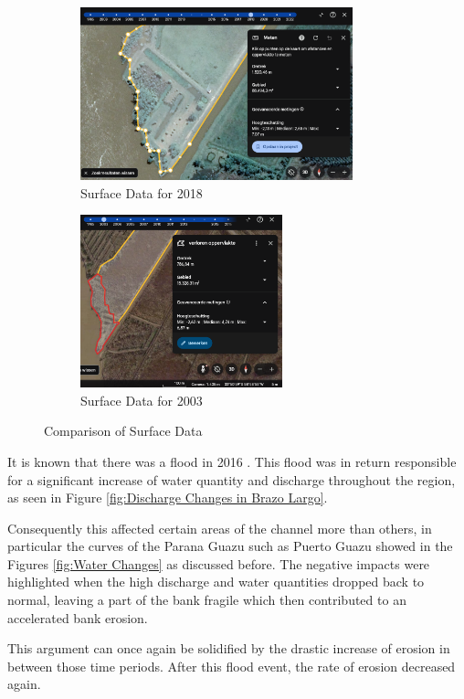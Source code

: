 \begin{figure}[H]
\begin{subfigure}[b]{0.45\textwidth}
        \includegraphics[width=\linewidth, height=5cm]{figures/appendix-g/opp2018.png}
        \caption{Surface Data for 2018}
        \label{fig:surface2018}
    \end{subfigure}
    \hfill
    \begin{subfigure}[b]{0.45\textwidth} %
        \includegraphics[width=\linewidth, height=5cm]{figures/appendix-g/verlorenopp2003.png}
        \caption{Surface Data for 2003}
        \label{fig:surface2003.2}
    \end{subfigure}
    \caption{Comparison of Surface Data}
    \label{fig:surface_comparison}
\end{figure}

It is known that there was a flood in 2016 \autocite{ArgentinaInundacionesDesde2016}. This flood was in return responsible for a significant increase of water quantity and discharge throughout the region, as seen in Figure \ref{fig:Discharge Changes in Brazo Largo}.

Consequently this affected certain areas of the channel more than others, in particular the curves of the Parana Guazu such as Puerto Guazu showed in the Figures \ref{fig:Water Changes} as discussed before. The negative impacts were highlighted when the high discharge and water quantities dropped back to normal, leaving a part of the bank fragile which then contributed to an accelerated bank erosion.



This argument can once again be solidified by the drastic increase of erosion in between those time periods. After this flood event, the rate of erosion decreased again.


